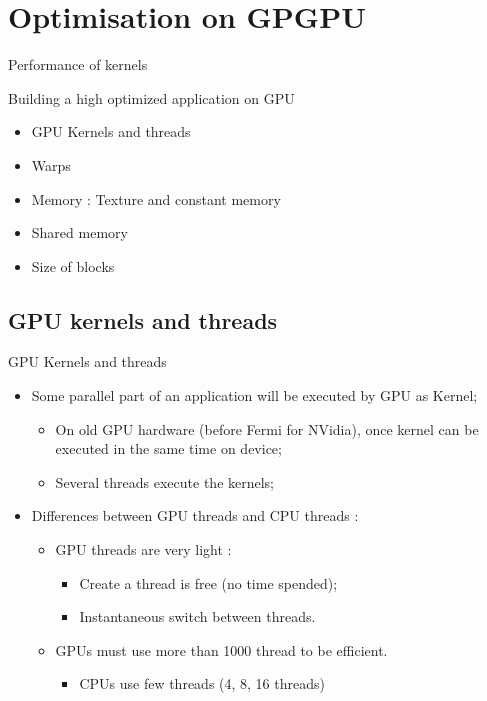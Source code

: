 \documentclass{beamer}
\begin{document}
\section{Optimisation on GPGPU}

\begin{frame}{Performance of kernels}

\begin{center}\Large
Building a high optimized application on GPU
\end{center}

\begin{itemize}
\item GPU Kernels and threads
\item Warps
\item Memory : Texture and constant memory
\item Shared memory
\item Size of blocks
\end{itemize}
\end{frame}

\subsection{GPU kernels and threads}

\begin{frame}{GPU Kernels and threads}
\begin{itemize}
\item Some parallel part of an application will be executed by GPU as Kernel;
  \begin{itemize}
  \item On old GPU hardware (before Fermi for NVidia), once kernel can be
    executed in the same time on device;
  \item Several threads execute the kernels;
  \end{itemize}
\item Differences between GPU threads and CPU threads :
  \begin{itemize}
  \item GPU threads are very light :
    \begin{itemize}
    \item Create a thread is free (no time spended);
    \item Instantaneous switch between threads.
    \end{itemize}
  \item GPUs must use more than 1000 thread to be efficient.
    \begin{itemize}
    \item CPUs use few threads (4, 8, 16 threads)
    \end{itemize}
  \end{itemize}
\end{itemize}
\end{frame}
\end{document}
